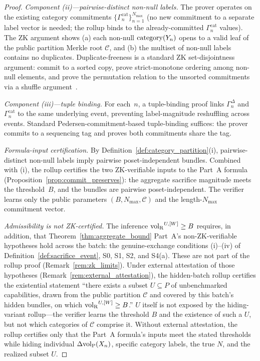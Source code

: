 \begin{proof}
\emph{Component (ii)---pairwise-distinct non-null labels.}
The prover operates on the existing category commitments
$\{\Gamma^{\mathrm{cat}}_n\}_{n=1}^{N_{\max}}$ (no new commitment
to a separate label vector is needed; the rollup binds to the
already-committed $\Gamma^{\mathrm{cat}}_n$ values).  The ZK
argument shows (a) each non-null $\mathrm{category}(Y_{n})$ opens to a valid
leaf of the public partition Merkle root $\mathcal{C}$, and (b)
the multiset of non-null labels contains no duplicates.
Duplicate-freeness is a standard ZK set-disjointness argument:
commit to a sorted copy, prove strict-monotone ordering
among non-null elements, and prove the permutation relation to
the unsorted commitments via a shuffle
argument~\citep[Definition~7]{lasser2026exo}.

\emph{Component (iii)---tuple binding.}
For each~$n$, a tuple-binding proof links $\Gamma^{\Delta}_n$
and $\Gamma^{\mathrm{cat}}_n$ to the same underlying event,
preventing label-magnitude reshuffling across events.  Standard
Pedersen-commitment-based tuple-binding suffices: the prover
commits to a sequencing tag and proves both commitments share
the tag.

\emph{Formula-input certification.}
By Definition~\ref{def:category_partition}(i), pairwise-distinct
non-null labels imply pairwise poset-independent bundles.
Combined with (i), the rollup certifies the two ZK-verifiable
inputs to the Part~A formula
(Proposition~\ref{prop:commit_preserves}): the aggregate
sacrifice magnitude meets the threshold~$B$, and the bundles are
pairwise poset-independent.  The verifier learns only the public
parameters $(B, N_{\max}, \mathcal{C})$ and the
length-$N_{\max}$ commitment vector.

\emph{Admissibility is not ZK-certified.}  The inference
${\operatorname{vol}_{\mathrm{R}}}^{U,[W]} \geq B$ requires, in addition, that
Theorem~\ref{thm:aggregate_bound} Part~A's non-ZK-verifiable
hypotheses hold across the batch: the genuine-exchange
conditions (i)--(iv) of Definition~\ref{def:sacrifice_event},
S0, S1, S2, and S4(a).  These are not part of the rollup proof
(Remark~\ref{rem:zk_limits}).  Under external attestation of
those hypotheses (Remark~\ref{rem:external_attestation}), the
hidden-batch rollup certifies the existential statement
``there exists a subset $U \subseteq P$ of unbenchmarked
capabilities, drawn from the public partition $\mathcal{C}$ and
covered by this batch's hidden bundles, on which ${\operatorname{vol}_{\mathrm{R}}}^{U,[W]}
\geq B$.''  $U$ itself is not exposed by the hiding-variant
rollup---the verifier learns the threshold $B$ and the
existence of such a $U$, but not which categories of
$\mathcal{C}$ comprise it.  Without external attestation, the
rollup certifies only that the Part~A formula's inputs meet the
stated thresholds while hiding individual $\Delta{\operatorname{vol}_{\mathrm{P}}}(X_n)$,
specific category labels, the true $N$, and the realized
subset $U$.
\end{proof}

